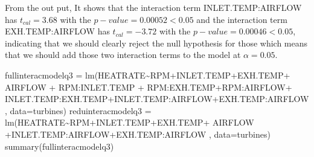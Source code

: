 \documentclass[
]{article}
\newenvironment{Shaded}{\begin{snugshade}}{\end{snugshade}}
\newcommand{\AttributeTok}[1]{\textcolor[rgb]{0.77,0.63,0.00}{#1}}
\newcommand{\FunctionTok}[1]{\textcolor[rgb]{0.00,0.00,0.00}{#1}}
\newcommand{\NormalTok}[1]{#1}
\newcommand{\OtherTok}[1]{\textcolor[rgb]{0.56,0.35,0.01}{#1}}
\newcommand{\SpecialCharTok}[1]{\textcolor[rgb]{0.00,0.00,0.00}{#1}}
\begin{document}
From the out put, It shows that the interaction term INLET.TEMP:AIRFLOW
has \(t_{cal}=3.68\) with the \(p-value= 0.00052 < 0.05\) and the
interaction term EXH.TEMP:AIRFLOW has \(t_{cal}=-3.72\) with the
\(p-value= 0.00046 < 0.05\), indicating that we should clearly reject
the null hypothesis for those which means that we should add those two
interaction terms to the model at \(α=0.05\).

\begin{Shaded}
\begin{Highlighting}[]
\NormalTok{fullinteracmodelq3 }\OtherTok{=} \FunctionTok{lm}\NormalTok{(HEATRATE}\SpecialCharTok{\textasciitilde{}}\NormalTok{RPM}\SpecialCharTok{+}\NormalTok{INLET.TEMP}\SpecialCharTok{+}\NormalTok{EXH.TEMP}\SpecialCharTok{+}\NormalTok{ AIRFLOW }\SpecialCharTok{+}\NormalTok{ RPM}\SpecialCharTok{:}\NormalTok{INLET.TEMP }\SpecialCharTok{+}\NormalTok{ RPM}\SpecialCharTok{:}\NormalTok{EXH.TEMP}\SpecialCharTok{+}\NormalTok{RPM}\SpecialCharTok{:}\NormalTok{AIRFLOW}\SpecialCharTok{+}\NormalTok{ INLET.TEMP}\SpecialCharTok{:}\NormalTok{EXH.TEMP}\SpecialCharTok{+}\NormalTok{INLET.TEMP}\SpecialCharTok{:}\NormalTok{AIRFLOW}\SpecialCharTok{+}\NormalTok{EXH.TEMP}\SpecialCharTok{:}\NormalTok{AIRFLOW , }\AttributeTok{data=}\NormalTok{turbines)}
\NormalTok{reduinteracmodelq3 }\OtherTok{=}  \FunctionTok{lm}\NormalTok{(HEATRATE}\SpecialCharTok{\textasciitilde{}}\NormalTok{RPM}\SpecialCharTok{+}\NormalTok{INLET.TEMP}\SpecialCharTok{+}\NormalTok{EXH.TEMP}\SpecialCharTok{+}\NormalTok{ AIRFLOW }\SpecialCharTok{+}\NormalTok{INLET.TEMP}\SpecialCharTok{:}\NormalTok{AIRFLOW}\SpecialCharTok{+}\NormalTok{EXH.TEMP}\SpecialCharTok{:}\NormalTok{AIRFLOW , }\AttributeTok{data=}\NormalTok{turbines)}
\FunctionTok{summary}\NormalTok{(fullinteracmodelq3)}
\end{Highlighting}
\end{Shaded}
\end{document}
